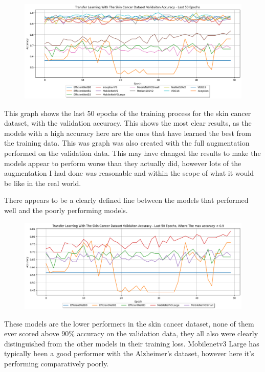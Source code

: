 \documentclass[]{final_report}
\begin{document}
\pagebreak

\begin{figure}[ht!]
  \centering
  \includegraphics[width=1.1\textwidth]{images/skin-cancer-validation-accuracy-last-50.png}
\end{figure}

This graph shows the last 50 epochs of the training process for the skin cancer dataset, with the validation accuracy. This shows the most clear results, as the models with a high accuracy here are the ones that have learned the best from the training data.
This was graph was also created with the full augmentation performed on the validation data. This may have changed the results to make the models appear to perform worse than they actually did, however lots of the augmentation I had done was reasonable and within the scope of what it would be like in the real world.

There appears to be a clearly defined line between the models that performed well and the poorly performing models.

\begin{figure}[ht!]
  \centering
  \includegraphics[width=1.1\textwidth]{images/Skin-cancer-validation-accuracy-last-50-low-performers.png}
\end{figure}

These models are the lower performers in the skin cancer dataset, none of them ever scored above 90\% accuracy on the validation data, they all also were clearly distinguished from the other models in their training loss. Mobilenetv3 Large has typically been a good performer with the Alzheimer's dataset, however here it's performing comparatively poorly.
\end{document}

